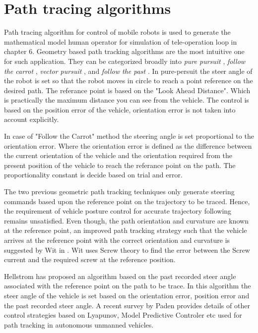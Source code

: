 \section{Path tracing algorithms}
Path tracing algorithm for control of mobile robots is used to generate the mathematical model human operator for simulation of tele-operation loop in chapter 6. Geometry based path tracking algorithms are the most intuitive one for such application. They can be categorized broadly into  \textit{pure pursuit} \cite{coulter1992implementation}, \textit{follow the carrot} \cite{barton2001controller}, \textit{vector pursuit} \cite{wit2004autonomous}, and \textit{follow the past} \cite{hellstrom2006follow}. In pure-persuit \cite{coulter1992implementation} the steer angle of the robot is set so that the robot moves in circle to reach a point reference   on the desired path. The referance point is based on the "Look Ahead Distance". Which is practically the maximum distance you can see from the vehicle.  The control is based on the position error of the vehicle,  orientation error is not taken into account explicitly. 

In case of "Follow the Carrot" method \cite{barton2001controller}  the steering angle is set proportional to the orientation error. Where the orientation error is defined as the difference between the current orientation of the vehicle and the orientation required from the present position of the vehicle to reach the referance point on the path.  The proportionality constant is decide based on trial and error.

 The two previous geometric path tracking techniques only generate steering
commands based upon the reference point on the trajectory to be traced. Hence, the requirement of vehicle posture control for accurate trajectory following remains unsatisfied. Even though, the path orientation and curvature are known at the reference point, an improved path tracking strategy such that the vehicle arrives at the reference point  with the correct orientation and curvature is suggested  by Wit in \cite{wit2004autonomous}. Wit uses Screw theory to find the error between the Screw current and the required screw at the reference position.

Hellstrom \cite{hellstrom2006follow} has proposed an algorithm based on the past recorded steer angle associated with the reference point on the path to be trace. In this algorithm the steer angle of the vehicle is set based on the orientation error, position error and the past recorded steer angle. A recent survey by Paden \cite{paden2016survey} provides details of other control strategies based on Lyapunov, Model Predictive Controler etc   used for path tracking in autonomous unmanned vehicles.  



